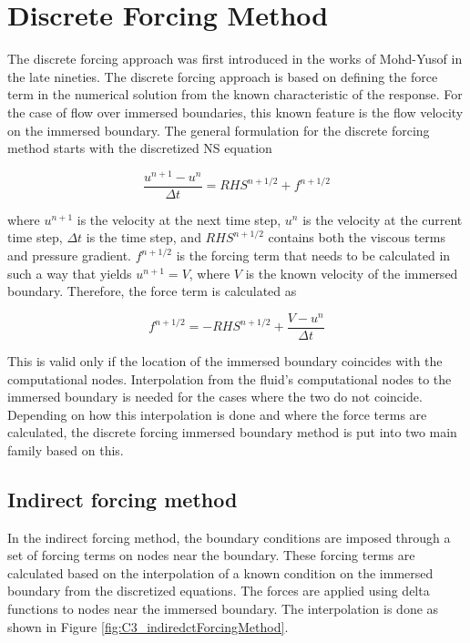 \section{Discrete Forcing Method}
The discrete forcing approach was first introduced in the works of Mohd-Yusof \cite{mohd1997combined} in the late nineties. The discrete forcing approach is based on defining the force term in the numerical solution from the known characteristic of the response. For the case of flow over immersed boundaries, this known feature is the flow velocity on the immersed boundary. The general formulation for the discrete forcing method starts with the discretized NS equation

\begin{equation}\label{eq:C3_discreteNSforIndirectForcing}
    \frac{u^{n+1} - u^n}{\Delta t} = RHS^{n+1/2} + f^{n+1/2}
\end{equation}

where $u^{n+1}$ is the velocity at the next time step, $u^n$ is the velocity at the current time step, $\Delta t$ is the time step, and $RHS^{n+1/2}$ contains both the viscous terms and pressure gradient. $f^{n+1/2}$ is the forcing term that needs to be calculated in such a way that yields $u^{n+1} = V$, where $V$ is the known velocity of the immersed boundary. Therefore, the force term is calculated as

\begin{equation}\label{eq:C3_indirectForceing}
    f^{n+1/2} = -RHS^{n+1/2} + \frac{V - u^n}{\Delta t}
\end{equation}

This is valid only if the location of the immersed boundary coincides with the computational nodes. Interpolation from the fluid's computational nodes to the immersed boundary is needed for the cases where the two do not coincide. Depending on how this interpolation is done and where the force terms are calculated, the discrete forcing immersed boundary method is put into two main family based on this.

\subsection{Indirect forcing method}
In the indirect forcing method, the boundary conditions are imposed through a set of forcing terms on nodes near the boundary. These forcing terms are calculated based on the interpolation of a known condition on the immersed boundary from the discretized equations. The forces are applied using delta functions to nodes near the immersed boundary. The interpolation is done as shown in Figure \ref{fig:C3_indiredctForcingMethod}.

